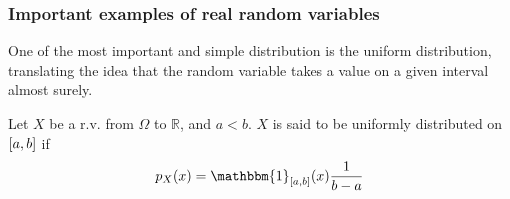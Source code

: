 \documentclass[../../Main_ManuscritThese.tex]{subfiles}
\begin{document}
\subsubsection{Important examples of real random variables}

One of the most important and simple distribution is the uniform
distribution, translating the idea that the random variable takes a
value on a given interval almost surely.
\begin{example}
  Let $X$ be a r.v. from $\Omega$ to $\mathbb{R}$, and $a < b$.
  $X$ is said to be uniformly distributed on $\interval{a}{b}$ if
  \begin{align}
    p_X(x) = \mathbbm{1}_{\interval{a}{b}}(x)\frac{1}{b-a}
  \end{align}
\end{example}
\end{document}
